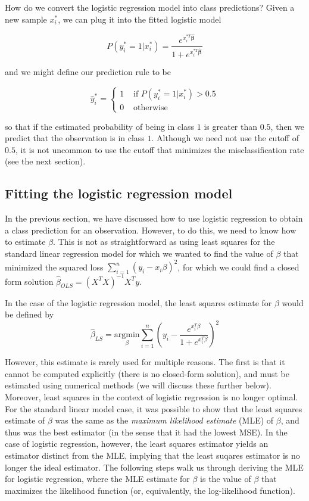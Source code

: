 How do we convert the logistic regression model into class predictions? Given a new sample $x_i^*$, we can plug it into the fitted logistic model

$$P(y_i^* = 1 | x_i^*) = \frac{e^{x_i^{*T} \boldsymbol{\hat{\beta}}} }{1 + e^{x_i^{*T} \boldsymbol{\hat{\beta}}}}$$

and we might define our prediction rule to be

$$\hat{y}_i^* = \begin{cases} 1 & \text{ if $P(y_i^* = 1 | x_i^*) > 0.5$}\\ 0 & \text{ otherwise}\end{cases}$$

so that if the estimated probability of being in class $1$ is greater than $0.5$, then we predict that the observation is in class $1$. Although we need not use the cutoff of $0.5$, it is not uncommon to use the cutoff that minimizes the misclassification rate (see the next section).


\subsection*{Fitting the logistic regression model}


In the previous section, we have discussed how to use logistic regression to obtain a class prediction for an observation. However, to do this, we need to know how to estimate $\beta$. This is not as straightforward as using least squares for the standard linear regression model for which we wanted to find the value of $\beta$ that minimized the squared loss $\sum_{i=1}^n (y_i - x_i\beta)^2$, for which we could find a closed form solution $\hat{\beta}_{OLS} = (X^TX)^{-1} X^T y$. 

In the case of the logistic regression model, the least squares estimate for $\beta$ would be defined by 
$$\hat{\beta}_{LS} = \underset{\beta}{\text{argmin}} \sum_{i=1}^n \left(y_i -  \frac{e^{x_i^T \beta}}{1 + e^{x_i^T \beta}}\right)^2$$ 

However, this estimate is rarely used for multiple reasons. The first is that it cannot be computed explicitly (there is no closed-form solution), and must be estimated using numerical methods (we will discuss these further below). Moreover, least squares in the context of logistic regression is no longer optimal. For the standard linear model case, it was possible to show that the least squares estimate of $\beta$ was the same as the \textit{maximum likelihood estimate} (MLE) of $\beta$, and thus was the best estimator (in the sense that it had the lowest MSE). In the case of logistic regression, however, the least squares estimator yields an estimator distinct from the MLE, implying that the least suqares estimator is no longer the ideal estimator. The following steps walk us through deriving the MLE for logistic regression, where the MLE estimate for $\beta$ is the value of $\beta$ that maximizes the likelihood function (or, equivalently, the log-likelihood function).

